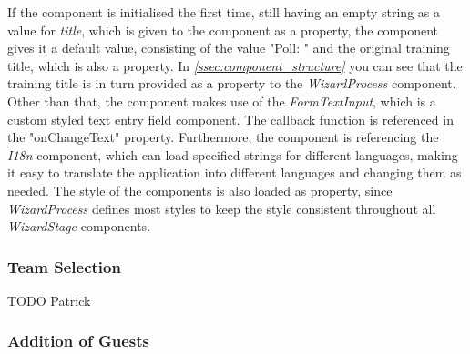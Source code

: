 If the component is initialised the first time, still having an empty string as a value for \textit{title}, which is given to the component as a property, the component gives it a default value, consisting of the value "Poll: " and the original training title, which is also a property. In \textit{\ref{ssec:component_structure} } you can see that the training title is in turn provided as a property to the \textit{WizardProcess} component.
\newline
Other than that, the component makes use of the \textit{FormTextInput}, which is a custom styled text entry field component. The callback function is referenced in the "onChangeText" property. Furthermore, the component is referencing the \textit{I18n} component, which can load specified strings for different languages, making it easy to translate the application into different languages and changing them as needed. The style of the components is also loaded as property, since \textit{WizardProcess} defines most styles to keep the style consistent throughout all \textit{WizardStage} components.

\subsubsection{Team Selection}
\label{sssec:poll_team}

TODO Patrick

\subsubsection{Addition of Guests}
\label{sssec:poll_guests}

